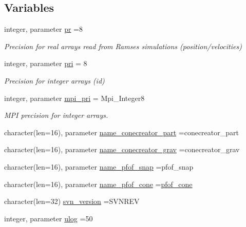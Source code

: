 \subsection*{Variables}
\begin{DoxyCompactItemize}
\item 
integer, parameter \hyperlink{namespacemodconstant_a54966a555666da051c8c851545e11ff7}{pr} =8
\begin{DoxyCompactList}\small\item\em Precision for real arrays read from Ramses simulations (position/velocities) \end{DoxyCompactList}\item 
integer, parameter \hyperlink{namespacemodconstant_a3463d55217ae4b194f21c061a619c48e}{pri} = 8
\begin{DoxyCompactList}\small\item\em Precision for integer arrays (id) \end{DoxyCompactList}\item 
integer, parameter \hyperlink{namespacemodconstant_a4c7b1b69a38bfb69c932e4a770dae783}{mpi\+\_\+pri} = Mpi\+\_\+\+Integer8
\begin{DoxyCompactList}\small\item\em M\+PI precision for integer arrays. \end{DoxyCompactList}\item 
character(len=16), parameter \hyperlink{namespacemodconstant_a6afcef14340a8cd5b8736b89385ab062}{name\+\_\+conecreator\+\_\+part} =\textquotesingle{}conecreator\+\_\+part\textquotesingle{}
\item 
character(len=16), parameter \hyperlink{namespacemodconstant_ad761f8ece8de325d4dc3d9cb425fedc5}{name\+\_\+conecreator\+\_\+grav} =\textquotesingle{}conecreator\+\_\+grav\textquotesingle{}
\item 
character(len=16), parameter \hyperlink{namespacemodconstant_affe7d9379bfee250c843169c7bb10f1c}{name\+\_\+pfof\+\_\+snap} =\textquotesingle{}pfof\+\_\+snap\textquotesingle{}
\item 
character(len=16), parameter \hyperlink{namespacemodconstant_a7fbb091f14c29c3ca972099325219e3c}{name\+\_\+pfof\+\_\+cone} =\textquotesingle{}\hyperlink{pfof__cone_8f90_addc770475dc2e497bf70a10ebc158aed}{pfof\+\_\+cone}\textquotesingle{}
\item 
character(len=32) \hyperlink{namespacemodconstant_a56d13db2836a9091e5e89be74deaedd6}{svn\+\_\+version} =S\+V\+N\+R\+EV
\item 
integer, parameter \hyperlink{namespacemodconstant_a6921eef21b749faf744304003fa3ac63}{ulog} =50

\end{DoxyCompactItemize}
